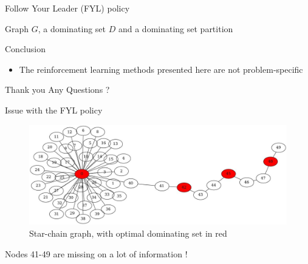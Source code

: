 \documentclass{beamer}
\begin{document}
\begin{frame}{Follow Your Leader (FYL) policy}
  \begin{algorithm}[H]
    \caption{Follow Your Leader (FYL) policy}
    \begin{algorithmic}
       Graph $G$, a dominating set $D$ and a dominating set partition
   \end{algorithmic}
  \end{algorithm}
\end{frame}

\begin{frame}{Conclusion}
\begin{itemize}
\item The reinforcement learning methods presented here are \alert{not problem-specific}\end{itemize}
\end{frame}


\begin{frame}{Thank you}
\centering \Huge Any Questions ?
\end{frame}

\begin{frame}
\AtNextBibliography{\tiny}
\printbibliography
\end{frame}




\begin{frame}{Issue with the FYL policy}
\begin{figure}
\includegraphics[scale=0.25]{star-chain}
\caption{Star-chain graph, with optimal dominating set in red}
\end{figure}
Nodes 41-49 are \alert{missing on a lot of information} !
\end{frame}
\end{document}
